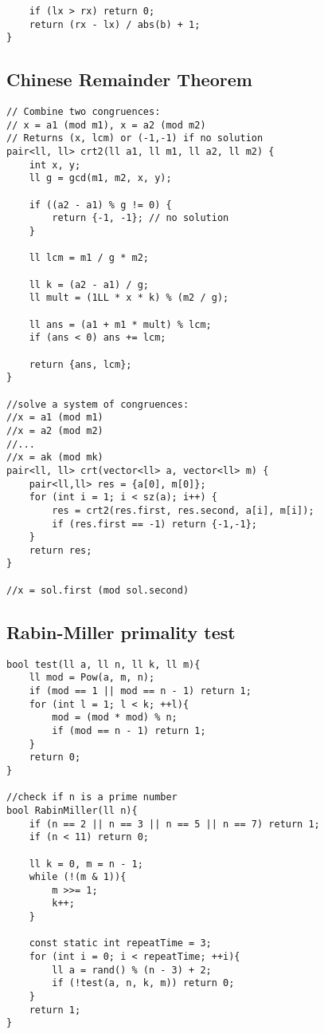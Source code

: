 \documentclass[11pt,a4paper]{article}
\begin{document}
\begin{multicols*}{2}
\begin{lstlisting}
    if (lx > rx) return 0;
    return (rx - lx) / abs(b) + 1;
}
\end{lstlisting}

\subsection{Chinese Remainder Theorem}
\begin{lstlisting}
// Combine two congruences: 
// x = a1 (mod m1), x = a2 (mod m2)
// Returns (x, lcm) or (-1,-1) if no solution
pair<ll, ll> crt2(ll a1, ll m1, ll a2, ll m2) {
    int x, y;
    ll g = gcd(m1, m2, x, y);

    if ((a2 - a1) % g != 0) {
        return {-1, -1}; // no solution
    }

    ll lcm = m1 / g * m2;

    ll k = (a2 - a1) / g;
    ll mult = (1LL * x * k) % (m2 / g);

    ll ans = (a1 + m1 * mult) % lcm;
    if (ans < 0) ans += lcm;

    return {ans, lcm};
}

//solve a system of congruences:
//x = a1 (mod m1)
//x = a2 (mod m2)
//...
//x = ak (mod mk)
pair<ll, ll> crt(vector<ll> a, vector<ll> m) {
    pair<ll,ll> res = {a[0], m[0]};
    for (int i = 1; i < sz(a); i++) {
        res = crt2(res.first, res.second, a[i], m[i]);
        if (res.first == -1) return {-1,-1};
    }
    return res;
}

//x = sol.first (mod sol.second)
\end{lstlisting}

\subsection{Rabin-Miller primality test}
\begin{lstlisting}
bool test(ll a, ll n, ll k, ll m){
    ll mod = Pow(a, m, n);
    if (mod == 1 || mod == n - 1) return 1;
    for (int l = 1; l < k; ++l){
        mod = (mod * mod) % n;
        if (mod == n - 1) return 1;
    }
    return 0;
}

//check if n is a prime number
bool RabinMiller(ll n){
    if (n == 2 || n == 3 || n == 5 || n == 7) return 1;
    if (n < 11) return 0;

    ll k = 0, m = n - 1;
    while (!(m & 1)){
        m >>= 1;
        k++;
    }

    const static int repeatTime = 3;
    for (int i = 0; i < repeatTime; ++i){
        ll a = rand() % (n - 3) + 2;
        if (!test(a, n, k, m)) return 0;
    }
    return 1;
}
\end{lstlisting}


\end{multicols*}
\end{document}
